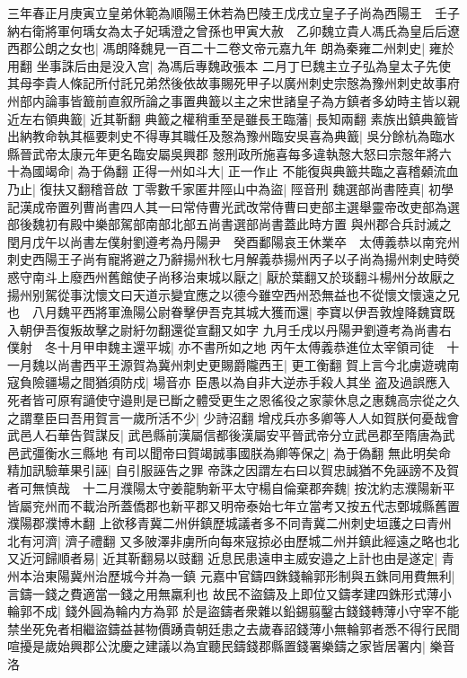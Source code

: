 三年春正月庚寅立皇弟休範為順陽王休若為巴陵王戊戌立皇子子尚為西陽王　壬子納右衛將軍何瑀女為太子妃瑀澄之曾孫也甲寅大赦　乙卯魏立貴人馮氏為皇后后遼西郡公朗之女也|{
	馮朗降魏見一百二十二卷文帝元嘉九年}
朗為秦雍二州刺史|{
	雍於用翻}
坐事誅后由是没入宫|{
	為馮后專魏政張本}
二月丁巳魏主立子弘為皇太子先使其母李貴人條記所付託兄弟然後依故事賜死甲子以廣州刺史宗慤為豫州刺史故事府州部内論事皆籖前直叙所論之事置典籖以主之宋世諸皇子為方鎮者多幼時主皆以親近左右領典籖|{
	近其靳翻}
典籖之權稍重至是雖長王臨藩|{
	長知兩翻}
素族出鎮典籖皆出納教命執其樞要刺史不得專其職任及慤為豫州臨安吳喜為典籖|{
	吳分餘杭為臨水縣晉武帝太康元年更名臨安屬吳興郡}
慤刑政所施喜每多違執慤大怒曰宗慤年將六十為國竭命|{
	為于偽翻}
正得一州如斗大|{
	正一作止}
不能復與典籖共臨之喜稽顙流血乃止|{
	復扶又翻稽音啟}
丁零數千家匿井陘山中為盜|{
	陘音刑}
魏選部尚書陸真|{
	初學記漢成帝置列曹尚書四人其一曰常侍曹光武改常侍曹曰吏部主選舉靈帝改吏部為選部後魏初有殿中樂部駕部南部北部五尚書選部尚書蓋此時方置}
與州郡合兵討滅之　閏月戊午以尚書左僕射劉遵考為丹陽尹　癸酉鄱陽哀王休業卒　太傅義恭以南兖州刺史西陽王子尚有寵將避之乃辭揚州秋七月解義恭揚州丙子以子尚為揚州刺史時熒惑守南斗上廢西州舊館使子尚移治東城以厭之|{
	厭於葉翻又於琰翻斗楊州分故厭之}
揚州别駕從事沈懷文曰天道示變宜應之以德今雖空西州恐無益也不從懷文懷遠之兄也　八月魏平西將軍漁陽公尉眷擊伊吾克其城大獲而還|{
	李寶以伊吾敦煌降魏寶既入朝伊吾復叛故擊之尉紆勿翻還從宣翻又如字}
九月壬戌以丹陽尹劉遵考為尚書右僕射　冬十月甲申魏主還平城|{
	亦不書所如之地}
丙午太傅義恭進位太宰領司徒　十一月魏以尚書西平王源賀為冀州刺史更賜爵隴西王|{
	更工衡翻}
賀上言今北虜遊魂南寇負險疆場之間猶須防戍|{
	場音亦}
臣愚以為自非大逆赤手殺人其坐盗及過誤應入死者皆可原宥讁使守邉則是已斷之體受更生之恩徭役之家蒙休息之惠魏高宗從之久之謂羣臣曰吾用賀言一歲所活不少|{
	少詩沼翻}
增戍兵亦多卿等人人如賀朕何憂哉會武邑人石華告賀謀反|{
	武邑縣前漢屬信都後漢屬安平晉武帝分立武邑郡至隋唐為武邑武彊衡水三縣地}
有司以聞帝曰賀竭誠事國朕為卿等保之|{
	為于偽翻}
無此明矣命精加訊驗華果引誣|{
	自引服誣告之罪}
帝誅之因謂左右曰以賀忠誠猶不免誣謗不及賀者可無慎哉　十二月濮陽太守姜龍駒新平太守楊自倫棄郡奔魏|{
	按沈約志濮陽新平皆屬兖州而不載治所蓋僑郡也新平郡又明帝泰始七年立當考又按五代志鄄城縣舊置濮陽郡濮博木翻}
上欲移青冀二州倂鎮歷城議者多不同青冀二州刺史垣護之曰青州北有河濟|{
	濟子禮翻}
又多陂澤非虜所向每來寇掠必由歷城二州并鎮此經遠之略也北又近河歸順者易|{
	近其靳翻易以豉翻}
近息民患遠申主威安邉之上計也由是遂定|{
	青州本治東陽冀州治歷城今并為一鎮}
元嘉中官鑄四銖錢輪郭形制與五銖同用費無利|{
	言鑄一錢之費適當一錢之用無羸利也}
故民不盜鑄及上即位又鑄孝建四銖形式薄小輪郭不成|{
	錢外圓為輪内方為郭}
於是盜鑄者衆雜以鉛錫翦鑿古錢錢轉薄小守宰不能禁坐死免者相繼盜鑄益甚物價踴貴朝廷患之去歲春詔錢薄小無輪郭者悉不得行民間喧擾是歲始興郡公沈慶之建議以為宜聽民鑄錢郡縣置錢署樂鑄之家皆居署内|{
	樂音洛}
